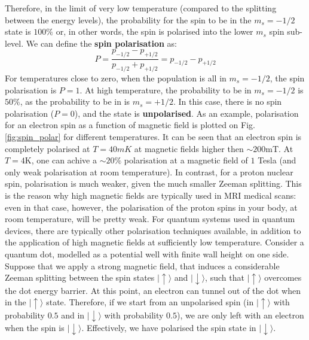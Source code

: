 \documentclass[a4paper,11pt]{article}
\newcommand{\ket}[1]{| #1 \rangle}
\begin{document}
Therefore, in the limit of very low temperature (compared to the splitting between the energy levels), the probability for the spin to be in the $m_s = -1/2$ state is $100\%$ or, in other words, the spin is polarised into the lower $m_s$ spin sub-level. We can define the {\bf spin polarisation} as:
\begin{equation}
    P = \frac{p_{-1/2}-p_{+1/2}}{p_{-1/2}+p_{+1/2}} = p_{-1/2}-p_{+1/2}
\end{equation}
For temperatures close to zero, when the population is all in $m_s = -1/2$, the spin polarisation is $P = 1$. At high temperature, the probability to be in $m_s=-1/2$ is $50\%$, as the probability to be in  is $m_s=+1/2$. In this case, there is no spin polarisation ($P=0$), and the state is {\bf unpolarised}.
\newline As an example, polarisation for an electron spin as a function of magnetic field is plotted on Fig. \ref{fig:spin_polar} for different temperatures. It can be seen that an electron spin is completely polarised at $T = 40 mK$ at magnetic fields higher then $\sim 200$mT. At $T=4$K, one can achive a $\sim 20\%$ polarisation at a magnetic field of $1$ Tesla (and only weak polarisation at room temperature).  In contrast, for a proton nuclear spin, polarisation is much weaker, given the much smaller Zeeman splitting. This is the reason why high magnetic fields are typically used in MRI medical scans: even in that case, however, the polarisation of the proton spins in your body, at room temperature, will be pretty weak.
\newline For quantum systems used in quantum devices, there are typically other polarisation techniques available, in addition to the application of high magnetic fields at sufficiently low temperature.
 Consider a quantum dot, modelled as a potential well with finite wall height on one side. Suppose that we apply a strong magnetic field, that induces a considerable Zeeman splitting between the spin states  $\ket{\uparrow}$ and $\ket{\downarrow}$, such that $\ket{\uparrow}$ overcomes the dot energy barrier. At this point, an electron can tunnel out of the dot when in the $\ket{\uparrow}$ state. Therefore, if we start from an unpolarised spin (in $\ket{\uparrow}$ with probability $0.5$ and in $\ket{\downarrow}$ with probability $0.5$), we are only left with an electron when the spin is $\ket{\downarrow}$. Effectively, we have polarised the spin state in $\ket{\downarrow}$.
\end{document}
